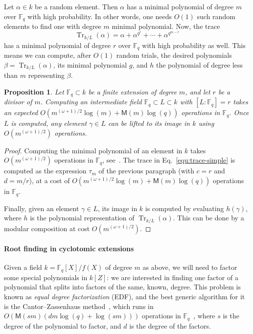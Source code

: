\documentclass[12pt]{article}
\theoremstyle{plain}
\newtheorem{proposition}[theorem]{Proposition}
\theoremstyle{definition}
\DeclareMathOperator{\trace}{Tr} %
\def\F{\ensuremath{\mathbb{F}}}
\def\MM{\ensuremath{\mathsf{M}}}
\newcounter{algorithm}
\begin{document}
Let $\alpha\in k$ be a random element. Then $\alpha$ has a minimal polynomial of degree $m$ 
over $\F_q$ with high probability. In other words, one needs $O(1)$ such random elements to find 
one with degree $m$ minimal polynomial. Now, the trace
\begin{equation}
	\label{equ:trace-simple}
	\trace_{k/L}(\alpha) = \alpha + \alpha^{q^r} + \cdots + \alpha^{q^{m - r}}
\end{equation}
has a minimal polynomial of degree $r$ over $\F_q$ with high
probability as well. This means we can compute, after $O(1)$ random
trials, the desired polynomials $\beta = \trace_{k/L}(\alpha)$,
its minimal polynomial
$g$, and $h$ the polynomial of degree less than $m$ representing $\beta$.

\begin{proposition}
	\label{prop:subfield}
	Let $\F_q \subset k$ be a finite extension of degree $m$, and
        let $r$ be a divisor of $m$.  Computing an intermediate field
        $\F_q \subset L \subset k$ with $[L:\F_q]=r$ takes an expected
        $O(m^{(\omega+1)/2}\log(m) + \MM(m)\log(q))$ operations in $\F_q$.  Once
        $L$ is computed, any element $\gamma\in L$ can be lifted to
        its image in $k$ using $O(m^{(\omega+1)/2})$ operations.
\end{proposition}
\begin{proof}
  Computing the minimal polynomial of an element in $k$ takes
  $O(m^{(\omega+1)/2})$ operations in $\F_q$, see~\cite{shoup93}. %
  The trace in Eq.~\eqref{equ:trace-simple} is computed as the
  expression $\tau_m$ of the previous paragraph (with $c=r$ and
  $d=m/r$), at a cost of $O(m^{(\omega+1)/2}\log(m)+\MM(m)\log(q))$
  operations in $\F_q$.
  
  Finally, given an element $\gamma\in L$, its image in $k$ is
  computed by evaluating $h(\gamma)$, where $h$ is the polynomial
  representation of $\trace_{k/L}(\alpha)$. This can be done by a
  modular composition at cost $O(m^{(\omega+1)/2})$.
\end{proof}

\paragraph{Root finding in cyclotomic extensions}
Given a field $k = \F_q[X]/f(X)$ of degree $m$ as above, we will need
to factor some special polynomials in $k[Z]$: we are interested in
finding one factor of a polynomial that splits into factors of the
same, known, degree. This problem is known as \emph{equal degree
  factorization} (EDF), and the best generic algorithm for it is the
Cantor--Zassenhaus method~\cite{cantor1981,von1992computing}, which
runs in $O(\MM(sm)(dm\log(q) + \log(sm)))$ operations in
$\F_q$~\cite[Th.~14.9]{vzGG}, where $s$ is the degree of the
polynomial to factor, and $d$ is the degree of the factors.
\end{document}
